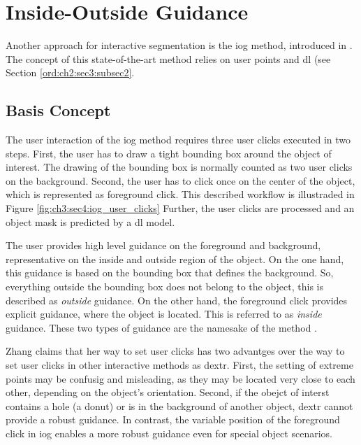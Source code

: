
\section{Inside-Outside Guidance}\label{ord:ch3:sec4}

Another approach for interactive segmentation is the \gls{iog} method, introduced in \cite{Zha20-IOG}.
The concept of this state-of-the-art method relies on user points and \gls{dl} (see Section \ref{ord:ch2:sec3:subsec2}. 

\subsection{Basis Concept}\label{ord:ch3:sec4:subsec1}
The user interaction of the \gls{iog} method requires three user clicks executed in two steps.
First, the user has to draw a tight bounding box around the object of interest. 
The drawing of the bounding box is normally counted as two user clicks on the background.
Second, the user has to click once on the center of the object, which is represented as foreground click. 
This described workflow is illustraded in Figure \ref{fig:ch3:sec4:iog_user_clicks}
Further, the user clicks are processed and an object mask is predicted by a \gls{dl} model.

The user provides high level guidance on the foreground and background, representative on the inside and outside region of the object.
On the one hand, this guidance is based on the bounding box that defines the background.
So, everything outside the bounding box does not belong to the object, this is described as \textit{outside} guidance.
On the other hand, the foreground click provides explicit guidance, where the object is located.
This is referred to as \textit{inside} guidance.
These two types of guidance are the namesake of the method .

Zhang claims that her way to set user clicks has two advantges over the way to set user clicks in other interactive methods as \gls{dextr}.
First, the setting of extreme points may be confusig and misleading, as they may be located very close to each other, depending on the object's orientation.
Second, if the obejct of interst contains a hole (\ie a donut) or is in the background of another object, \gls{dextr} cannot provide a robust guidance.
In contrast, the variable position of the foreground click in \gls{iog} enables a more robust guidance even for special object scenarios.

